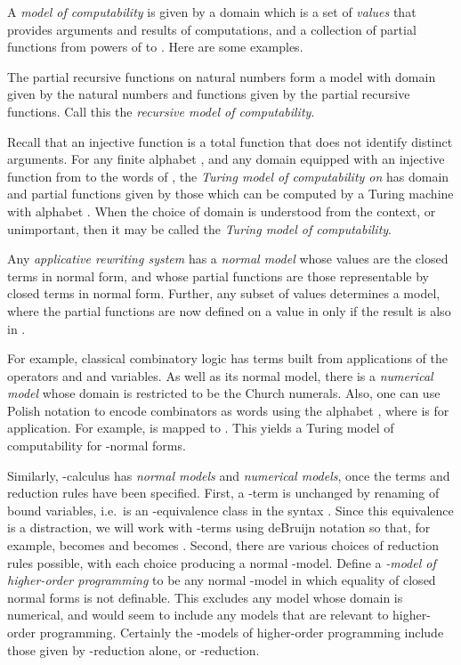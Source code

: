 \documentclass[a4paper]{article}
\begin{document}
A {\em model of computability}  is given by a domain
 which is a set of {\em values} that provides arguments and results
of computations, and a collection  of partial functions from
powers of  to .  Here are some examples.

The partial recursive functions on natural numbers form a model with
domain given by the natural numbers and functions given by
the partial recursive functions. Call this the {\em recursive model of
  computability}.

Recall that an injective function is a total function that does not
identify distinct arguments.  For any finite alphabet , and any
domain  equipped with an injective function from  to the words
of , the {\em Turing model of computability on } has domain
 and partial functions given by those which can be computed by a
Turing machine with alphabet .  When the choice of domain is
understood from the context, or unimportant, then it may be called the
{\em Turing model of computability}.

Any {\em applicative rewriting system} \cite{TRS} 
has a {\em normal model} whose values are the closed terms in normal form,
and whose partial functions are those representable by  closed terms
in normal form. Further, any subset  of values determines a model,
where the partial functions are now defined on a value in  only if
the result is also in . 

For example, classical combinatory logic has terms built from
applications of the operators  and  and variables.  As well
as its normal model, there is a {\em numerical model} whose domain is
restricted to be the Church numerals. Also, one can use Polish
notation to encode combinators as words using the alphabet , where  is for application. For example,  is
mapped to . This yields a Turing model of computability for
-normal forms.

Similarly, -calculus has {\em normal models} and {\em numerical
  models}, once the terms and reduction rules have been specified.
First, a -term is unchanged by renaming of bound variables, i.e.\
is an -equivalence class in the syntax \cite{Bare84a}. Since
this equivalence is a distraction, we will work with -terms using
deBruijn notation \cite{deBruijn} so that, for example, 
becomes  and  becomes . Second,
there are various choices of reduction rules possible, with each
choice producing a normal -model.  Define a {\em -model of
  higher-order programming} to be any normal -model in which
equality of closed normal forms is not definable.  This excludes
any model whose domain is numerical, and would seem to include any models
that are relevant to higher-order programming.  Certainly the
-models of higher-order programming include those given by
-reduction alone, or -reduction.
\end{document}

